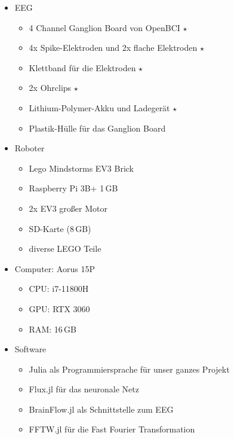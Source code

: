 \documentclass[11pt]{scrartcl}
\begin{document}
	\begin{itemize}
		\item EEG
		\begin{itemize}
			\item 4 Channel Ganglion Board von OpenBCI $\star$
			\item 4x Spike-Elektroden und 2x flache Elektroden  $\star$
			\item Klettband für die Elektroden $\star$
			\item 2x Ohrclips $\star$
			\item Lithium-Polymer-Akku und Ladegerät $\star$
			\item Plastik-Hülle für das Ganglion Board
		\end{itemize}

		\item Roboter
		\begin{itemize}
			\item Lego Mindstorms EV3 Brick
			\item Raspberry Pi 3B+ 1\,GB
			\item 2x EV3 großer Motor
			\item SD-Karte (8\,GB)
			\item diverse LEGO Teile
		\end{itemize}

		\item Computer: Aorus 15P
		\begin{itemize}
			\item CPU: i7-11800H
			\item GPU: RTX 3060
			\item RAM: 16\,GB
		\end{itemize}

		\item Software
		\begin{itemize}
			\item Julia als Programmiersprache für unser ganzes Projekt \cite{julia}
			\item Flux.jl für das neuronale Netz
				\cite{Flux.jl-2018}
				\cite{innes:2018}
			
			\item BrainFlow.jl als Schnittstelle zum EEG
				\cite{brainflow}
			
			\item FFTW.jl für die Fast Fourier Transformation
				\cite{FFTW.jl-2005}
			

\end{itemize}
\end{itemize}
\end{document}
